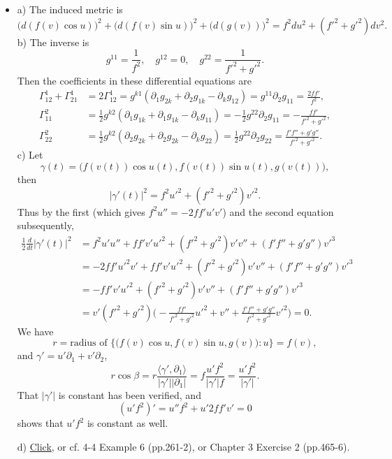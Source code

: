 \begin{itemize}
    \item[1.] a) The induced metric is
    \[\big(d(f(v)\cos u)\big)^2+\big(d(f(v)\sin u)\big)^2+\big(d(g(v))\big)^2
    =f^2du^2+(f'^2+g'^2)dv^2.\]
    b) The inverse is
    \[g^{11}=\frac{1}{f^2},\quad g^{12}=0,\quad g^{22}=\frac{1}{f'^2+g'^2}.\]
    Then the coefficients in these differential equations are
    \begin{align*}
        \Gamma_{12}^1+\Gamma_{21}^1&=2\Gamma_{12}^1
        =g^{k1}(\partial_1g_{2k}+\partial_2g_{1k}-\partial_kg_{12})
        =g^{11}\partial_2g_{11}=\frac{2ff'}{f^2},\\
        \Gamma_{11}^2
        &=\frac12 g^{k2}(\partial_1g_{1k}+\partial_1g_{1k}-\partial_kg_{11})
        =-\frac12 g^{22}\partial_2g_{11}=-\frac{ff'}{f'^2+g'^2},\\
        \Gamma_{22}^2
        &=\frac12 g^{k2}(\partial_2g_{2k}+\partial_2g_{2k}-\partial_kg_{22})
        =\frac12 g^{22}\partial_2g_{22}=\frac{f'f''+g'g''}{f'^2+g'^2}.
    \end{align*}
    c) Let
    \[\gamma(t)=\big(f(v(t))\cos u(t),f(v(t))\sin u(t),g(v(t))\big),\]
    then
    \[|\gamma'(t)|^2=f^2u'^2+(f'^2+g'^2)v'^2.\]
    Thus by the first (which gives $f^2u''=-2ff'u'v'$) 
    and the second equation subsequently,
    \begin{align*}
        \frac12\frac{d}{dt}|\gamma'(t)|^2
        &=f^2u'u''+ff'v'u'^2+(f'^2+g'^2)v'v''+(f'f''+g'g'')v'^3\\
        &=-2ff'u'^2v'+ff'v'u'^2+(f'^2+g'^2)v'v''+(f'f''+g'g'')v'^3\\
        &=-ff'v'u'^2+(f'^2+g'^2)v'v''+(f'f''+g'g'')v'^3\\
        &=v'(f'^2+g'^2)\bigg(-\frac{ff'}{f'^2+g'^2}u'^2
        +v''+\frac{f'f''+g'g''}{f'^2+g'^2}v'^2\bigg)=0.
    \end{align*}
    We have
    \[r=\text{radius of }\{\big(f(v)\cos u,f(v)\sin u,g(v)\big):u\}=f(v),\]
    and $\gamma'=u'\partial_1+v'\partial_2$,
    \[r\cos\beta=r\frac{\langle\gamma',\partial_1\rangle}{|\gamma'||\partial_1|}
    =f\frac{u'f^2}{|\gamma'|f}=\frac{u'f^2}{|\gamma'|}.\]
    That $|\gamma'|$ is constant has been verified, and
    \[(u'f^2)'=u''f^2+u'2ff'v'=0\]
    shows that $u'f^2$ is constant as well.

    d) \href{https://math.stackexchange.com/questions/3632077/geodesics-on-paraboloid-self-interesect-in-an-infinite-number-of-points?r=SearchResults}{Click}, 
    or cf. \cite{dC} 4-4 Example 6 (pp.261-2), 
    or \cite{CL} Chapter 3 Exercise 2 (pp.465-6).
    

\end{itemize}
